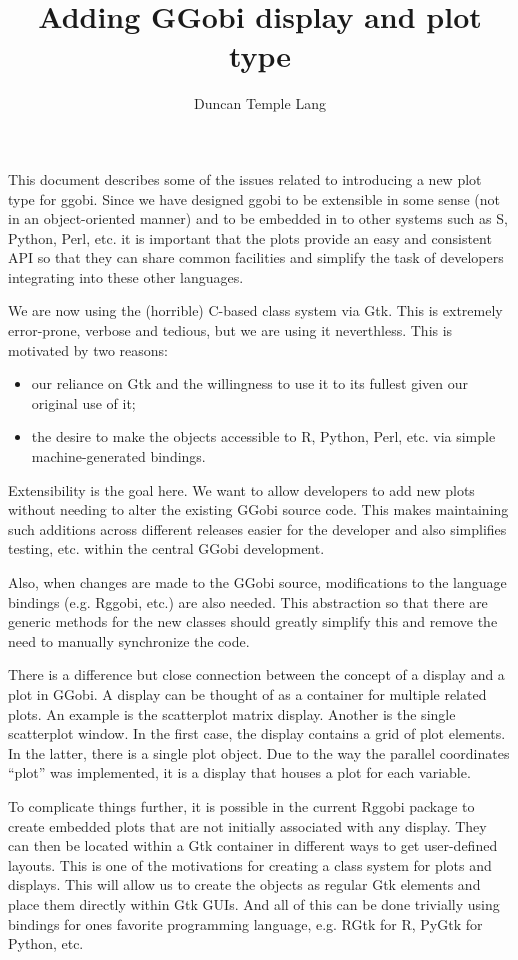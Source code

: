 \documentclass{article}
\title{Adding GGobi display and plot type}
\author{Duncan Temple Lang}
\begin{document}
\maketitle

This document describes some of the issues related to introducing a
new plot type for ggobi.  Since we have designed ggobi to be
extensible in some sense (not in an object-oriented manner) and to be
embedded in to other systems such as S, Python, Perl, etc.  it is
important that the plots provide an easy and consistent API so that
they can share common facilities and simplify the task of developers
integrating into these other languages.

We are now using the (horrible) C-based class system via Gtk. This is
extremely error-prone, verbose and tedious,
but we are using it neverthless.
This is motivated by two reasons:
\begin{itemize}
\item our reliance on Gtk and the willingness to use it to its fullest
given our original use of it;
\item the desire to make the objects accessible 
 to R, Python, Perl, etc. via simple machine-generated bindings.
\end{itemize}


Extensibility is the goal here. We want to allow developers to add new
plots without needing to alter the existing GGobi source code.  This
makes maintaining such additions across different releases easier for
the developer and also simplifies testing, etc. within the central
GGobi development.

Also, when changes are made to the GGobi source, modifications to the
language bindings (e.g. Rggobi, etc.) are also needed.  This
abstraction so that there are generic methods for the new classes
should greatly simplify this and remove the need to manually
synchronize the code.

There is a difference but close connection between the concept of a
display and a plot in GGobi.  A display can be thought of as a
container for multiple related plots.  An example is the scatterplot
matrix display.  Another is the single scatterplot window.  In the
first case, the display contains a grid of plot elements.  In the
latter, there is a single plot object.  Due to the way the parallel
coordinates ``plot'' was implemented, it is a display that houses a
plot for each variable.

To complicate things further, it is possible in the
current Rggobi package to create embedded plots
that are not initially associated with any display.
They can then be located within a Gtk container
in different ways to get user-defined layouts.
This is one of the motivations for creating a
class system for plots and displays. This will 
allow us to create the objects as regular Gtk elements
and place them directly within Gtk GUIs.
And all of this can be done trivially using 
bindings for ones favorite programming language,
e.g. RGtk for R, PyGtk for Python, etc.
\end{document}
